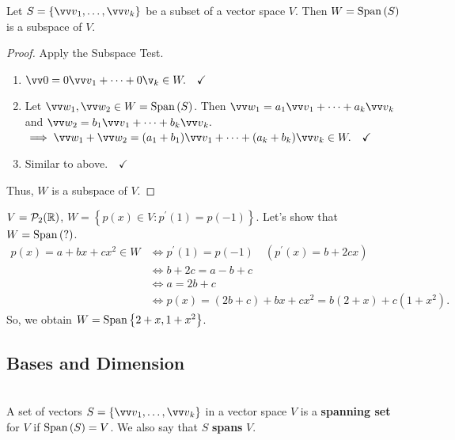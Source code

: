 \begin{proposition}
    Let $S = \left\{\vvv_1, \ldots, \vvv_k\right\}$ be a subset of a vector space $V$. Then
    $W = \operatorname{Span}{(S)}$ is a subspace of $V$.
\end{proposition}

\begin{proof}
    Apply the Subspace Test. 
    \begin{enumerate}
        \item $\vzero = 0\vvv_1 + \cdots + 0\v_k \in W. \quad \checkmark$
        \item Let $\vw_1, \vw_2 \in W = \spn{(S)}$. Then $\vw_1 = a_1\vvv_1 + \cdots + a_k\vvv_k$ and $\vw_2 = b_1\vvv_1 + \cdots + b_k\vvv_k.$
        $\implies \vw_1 + \vw_2 = (a_1 + b_1)\vvv_1 + \cdots + (a_k + b_k)\vvv_k \in W. \quad \checkmark$
        \item Similar to above.$\quad \checkmark$
    \end{enumerate}
    Thus, $W$ is a subspace of $V$.
\end{proof}

\begin{example}
    $V = \mathcal{P}_2({\mathbb{R}})$, $W = \left\{  p(x) \in V: p^\prime(1) = p(-1) \right\}$. Let's show that $W = \operatorname{Span}{(\text{?})}$.
    \begin{align*}
        p(x) = a + bx + cx^2 \in W &\iff p^\prime(1) = p(-1) \quad (p^\prime(x) = b + 2cx) \\
        &\iff b + 2c = a - b + c \\
        &\iff a = 2b + c \\
        &\iff p(x) = (2b + c) + bx + cx^2 = b(2 + x) + c(1 + x^2).
    \end{align*}
    So, we obtain $W = \operatorname{Span}{\left\{  2 + x, 1 + x^2 \right\}}$.
\end{example}


\subsection{Bases and Dimension}

\begin{definition}
    \phantom{}  \\
    A set of vectors $S = \left\{\vvv_1, \ldots, \vvv_k\right\}$ in a vector space $V$ is a
    \textbf{spanning set} for $V$ if $\operatorname{Span}{(S)} = V$. We also say that $S$ \textbf{spans} $V$.
\end{definition}

